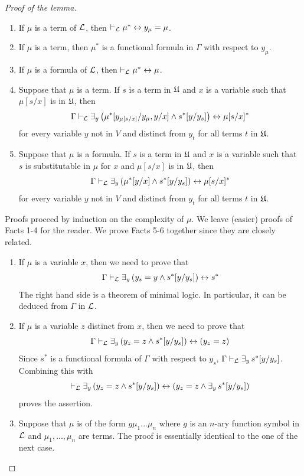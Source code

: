 \documentclass[10pt]{amsart}
\begin{document}
\begin{proof}[Proof of the lemma]
\begin{enumerate}[label=Fact \arabic*.]
    \item If $\mu$ is a term of ${\mathcal L}$, then $\vdash_{{\mathcal L}} \mu^* \leftrightarrow y_{\mu} = \mu$.
    \item If $\mu$ is a term, then $\mu^*$ is a functional formula in $\Gamma$ with respect to $y_{\mu}$.
    \item If $\mu$ is a formula of ${\mathcal L}$, then $\vdash_{{\mathcal L}} \mu^* \leftrightarrow \mu$.
		\item Suppose that $\mu$ is a term. If $s$ is a term in ${\mathfrak U}$ and $x$ is a variable such that $\mu[s/x]$ is in ${\mathfrak U}$, then
      $$\Gamma \vdash_{{\mathcal L}} \exists_y\left(\mu^*[y_{\mu[s/x]}/y_{\mu},y/x] \wedge s^*[y/y_s]\right) \leftrightarrow \mu[s/x]^*$$
		      for every variable $y$ not in $V$ and distinct from $y_t$ for all terms $t$ in ${\mathfrak U}$.
    \item Suppose that $\mu$ is a formula. If $s$ is a term in ${\mathfrak U}$ and $x$ is a variable such that $s$ is substitutable in $\mu$ for $x$ and $\mu[s/x]$ is in ${\mathfrak U}$, then
      $$\Gamma \vdash_{{\mathcal L}} \exists_y\left(\mu^*[y/x] \wedge s^*[y/y_s]\right) \leftrightarrow \mu[s/x]^*$$
		      for every variable $y$ not in $V$ and distinct from $y_t$ for all terms $t$ in ${\mathfrak U}$.
	\end{enumerate}
  Proofs proceed by induction on the complexity of $\mu$. We leave (easier) proofs of Facts 1-4 for the reader. We prove Facts 5-6 together since they are closely related.
	\begin{enumerate}[label=\textbf{(\arabic*)}, leftmargin=3.0em]
		\item If $\mu$ is a variable $x$, then we need to prove that
      $$\Gamma \vdash_{{\mathcal L}} \exists_y\left(y_s = y \wedge s^*[y/y_s]\right) \leftrightarrow s^*$$
      The right hand side is a theorem of minimal logic. In particular, it can be deduced from $\Gamma$ in ${\mathcal L}$.
  	\item If $\mu$ is a variable $z$ distinct from $x$, then we need to prove that
      $$\Gamma \vdash_{{\mathcal L}} \exists_y\left(y_z = z \wedge s^*[y/y_s]\right) \leftrightarrow (y_z = z)$$
      Since $s^*$ is a functional formula of $\Gamma$ with respect to $y_s$, $\Gamma \vdash_{{\mathcal L}} \exists_y\,s^*[y/y_s]$. Combining this with
      $$\vdash_{{\mathcal L}}\exists_y\left(y_z = z \wedge s^*[y/y_s]\right) \leftrightarrow \left(y_z = z \wedge \exists_y\,s^*[y/y_s]\right)$$
      proves the assertion.
		\item Suppose that $\mu$ is of the form $g\mu_1...\mu_n$ where $g$ is an $n$-ary function symbol in ${\mathcal L}$ and $\mu_1,...,\mu_n$ are terms. The proof is essentially identical to the one of the next case.

\end{enumerate}
\end{proof}
\end{document}

